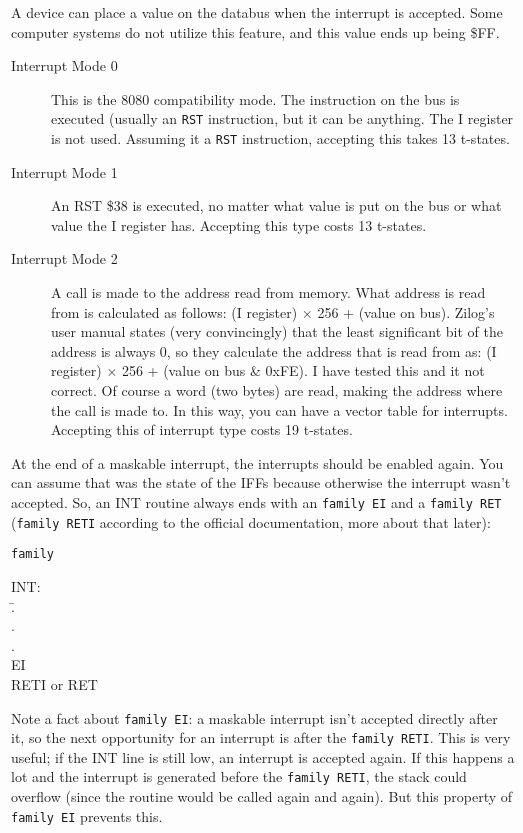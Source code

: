 \documentclass[twoside,openright,a4paper]{book}
\begin{document}
A device can place a value on the databus when the interrupt is accepted. Some computer systems do not utilize this feature, and this value ends up being \$FF.

\begin{description}

	\item[Interrupt Mode 0]
	This is the 8080 compatibility mode. The instruction on the bus is executed (usually an {\tt RST} instruction, but it can be anything.  The I register is not used. Assuming it a {\tt RST} instruction, accepting this takes 13 t-states.

	\item[Interrupt Mode 1]
	An RST \$38 is executed, no matter what value is put on the bus or what value the I register has. Accepting this type costs 13 t-states.

	\item[Interrupt Mode 2]
	A call is made to the address read from memory. What address is read from is calculated as follows: (I register) $\times$ 256 + (value on bus). Zilog's user manual states (very convincingly) that the least significant bit of the address is always 0, so they calculate the address that is read from as: (I register) $\times$ 256 + (value on bus \& 0xFE). I have tested this and it not correct. Of course a word (two bytes) are read, making the address where the call is made to. In this way, you can have a vector table for interrupts. Accepting this of interrupt type costs 19 t-states.

\end{description}

At the end of a maskable interrupt, the interrupts should be enabled again. You can assume that was the state of the IFFs because otherwise the interrupt wasn't accepted. So, an INT routine always ends with an {\tt family EI} and a {\tt family RET} ({\tt family RETI} according to the official documentation, more about that later):

{\tt family
	\begin{tabbing}
		INT:\\
		{\qquad}\=.\\
		\>.\\
		\>.\\
		\>EI\\
		\>RETI {\rmfamily or} RET
	\end{tabbing}
}

Note a fact about {\tt family EI}: a maskable interrupt isn't accepted directly after it, so the next opportunity for an interrupt is after the {\tt family RETI}. This is very useful; if the INT line is still low, an interrupt is accepted again.  If this happens a lot and the interrupt is generated before the {\tt family RETI}, the stack could overflow (since the routine would be called again and again). But this property of {\tt family EI} prevents this.
\end{document}
